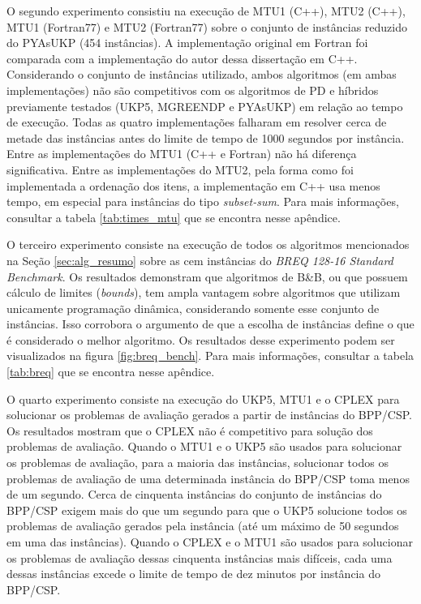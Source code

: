 O segundo experimento consistiu na execução de MTU1 (C++), MTU2 (C++), MTU1 (Fortran77) e MTU2 (Fortran77) sobre o conjunto de instâncias reduzido do PYAsUKP (454 instâncias).
A implementação original em Fortran foi comparada com a implementação do autor dessa dissertação em C++.
Considerando o conjunto de instâncias utilizado, ambos algoritmos (em ambas implementações) não são competitivos com os algoritmos de PD e híbridos previamente testados (UKP5, MGREENDP e PYAsUKP) em relação ao tempo de execução.
Todas as quatro implementações falharam em resolver cerca de metade das instâncias antes do limite de tempo de 1000 segundos por instância.
Entre as implementações do MTU1 (C++ e Fortran) não há diferença significativa.
Entre as implementações do MTU2, pela forma como foi implementada a ordenação dos itens, a implementação em C++ usa menos tempo, em especial para instâncias do tipo \emph{subset-sum}.
Para mais informações, consultar a tabela \ref{tab:times_mtu} que se encontra nesse apêndice.

O terceiro experimento consiste na execução de todos os algoritmos mencionados na Seção \ref{sec:alg_resumo} sobre as cem instâncias do \emph{BREQ 128-16 Standard Benchmark}. 
Os resultados demonstram que algoritmos de B\&B, ou que possuem cálculo de limites (\emph{bounds}), tem ampla vantagem sobre algoritmos que utilizam unicamente programação dinâmica, considerando somente esse conjunto de instâncias.
Isso corrobora o argumento de que a escolha de instâncias define o que é considerado o melhor algoritmo.
Os resultados desse experimento podem ser visualizados na figura \ref{fig:breq_bench}.
Para mais informações, consultar a tabela \ref{tab:breq} que se encontra nesse apêndice.

O quarto experimento consiste na execução do UKP5, MTU1 e o CPLEX para solucionar os problemas de avaliação gerados a partir de instâncias do BPP/CSP.
Os resultados mostram que o CPLEX não é competitivo para solução dos problemas de avaliação.
Quando o MTU1 e o UKP5 são usados para solucionar os problemas de avaliação, para a maioria das instâncias, solucionar todos os problemas de avaliação de uma determinada instância do BPP/CSP toma menos de um segundo.
Cerca de cinquenta instâncias do conjunto de instâncias do BPP/CSP exigem mais do que um segundo para que o UKP5 solucione todos os problemas de avaliação gerados pela instância (até um máximo de 50 segundos em uma das instâncias).
Quando o CPLEX e o MTU1 são usados para solucionar os problemas de avaliação dessas cinquenta instâncias mais difíceis, cada uma dessas instâncias excede o limite de tempo de dez minutos por instância do BPP/CSP.

